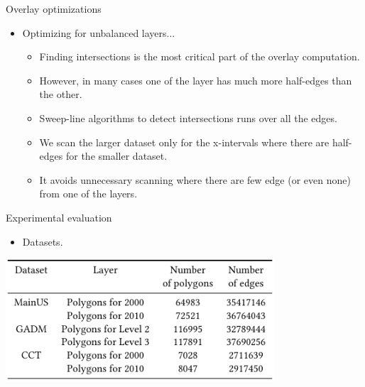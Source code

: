 \documentclass{beamer}
\begin{document}
    \begin{frame}{Overlay optimizations}
        \begin{itemize}
            \item Optimizing for unbalanced layers...
                \begin{itemize}
                    \item Finding intersections is the most critical part of the overlay computation.
                    \item However, in many cases one of the layer has much more half-edges than the other.
                    \item Sweep-line algorithms to detect intersections runs over all the edges.
                    \item We scan the larger dataset only for the x-intervals where there are half-edges for the smaller dataset.
                    \item It avoids unnecessary scanning where there are few edge (or even none) from one of the layers.
                \end{itemize}
        \end{itemize}
    \end{frame}
    
    \begin{frame}{Experimental evaluation}
        \begin{itemize}
            \item Datasets.
        \end{itemize}
        \vspace{1cm}
        \centering
        \includegraphics[width=0.75\textwidth]{figures/datasets}
    \end{frame}    
    
\end{document}
